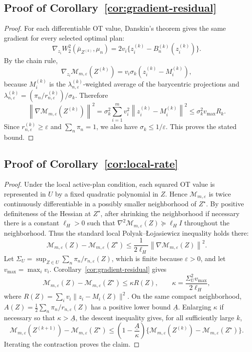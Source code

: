 \documentclass[pdflatex,sn-mathphys-ay]{sn-jnl}%
\theoremstyle{thmstyleone}%
\theoremstyle{thmstyletwo}%
\theoremstyle{thmstylethree}%
\newcommand{\calM}{\mathcal M}
\newcommand{\eps}{\varepsilon}
\newcommand{\barmu}{\bar\mu}
\newcommand{\norm}[1]{\left\lVert #1\right\rVert}
\begin{document}
\begin{appendices}
\subsection{Proof of Corollary~\ref{cor:gradient-residual}}
\begin{proof}
For each differentiable OT value, Danskin's theorem gives the same gradient for every selected optimal plan:
\[
\nabla_{z_i}W_2^2(\barmu_{Z^{(k)}},\mu_n)
=
2v_i\{z_i^{(k)}-B_n^{(k)}(z_i^{(k)})\}.
\]
By the chain rule,
\[
\nabla_{z_i}\calM_{m,\eps}(Z^{(k)})
=
 v_i \sigma_k\left(z_i^{(k)}-M_i^{(k)}\right),
\]
because \(M_i^{(k)}\) is the \(\lambda_{n,\eps}^{(k)}\)-weighted average of the barycentric projections and \(\lambda_{n,\eps}^{(k)}=(\pi_n/r_{n,\eps}^{(k)})/\sigma_k\). Therefore
\[
\norm{\nabla \calM_{m,\eps}(Z^{(k)})}^2
= \sigma_k^2\sum_{i=1}^m v_i^2\norm{z_i^{(k)}-M_i^{(k)}}^2
\le \sigma_k^2 v_{\max} R_k.
\]
Since \(r_{n,\eps}^{(k)}\ge \eps\) and \(\sum_n\pi_n=1\), we also have \(\sigma_k\le1/\eps\). This proves the stated bound.
\end{proof}

\subsection{Proof of Corollary~\ref{cor:local-rate}}
\begin{proof}
Under the local active-plan condition, each squared OT value is represented in \(U\) by a fixed quadratic polynomial in \(Z\). Hence \(\calM_{m,\eps}\) is twice continuously differentiable in a possibly smaller neighborhood of \(Z^\star\). By positive definiteness of the Hessian at \(Z^\star\), after shrinking the neighborhood if necessary there is a constant \(\ell_H>0\) such that \(\nabla^2\calM_{m,\eps}(Z)\succeq \ell_H I\) throughout the neighborhood. Thus the standard local Polyak--\L{}ojasiewicz inequality holds there:
\[
    \calM_{m,\eps}(Z)-\calM_{m,\eps}(Z^\star)
    \le \frac{1}{2\ell_H}\norm{\nabla\calM_{m,\eps}(Z)}^2.
\]
Let \(\Sigma_U=\sup_{Z\in U}\sum_n\pi_n/r_{n,\eps}(Z)\), which is finite because \(\eps>0\), and let \(v_{\max}=\max_i v_i\). Corollary~\ref{cor:gradient-residual} gives
\[
    \calM_{m,\eps}(Z)-\calM_{m,\eps}(Z^\star)
    \le \kappa R(Z),
    \qquad
    \kappa=\frac{\Sigma_U^2 v_{\max}}{2\ell_H},
\]
where \(R(Z)=\sum_i v_i\|z_i-M_i(Z)\|^2\). On the same compact neighborhood, \(A(Z)=\frac12\sum_n\pi_n/r_{n,\eps}(Z)\) has a positive lower bound \(\underline A\). Enlarging \(\kappa\) if necessary so that \(\kappa>\underline A\), the descent inequality gives, for all sufficiently large \(k\),
\[
\calM_{m,\eps}(Z^{(k+1)})-\calM_{m,\eps}(Z^\star)
\le
\left(1-\frac{\underline A}{\kappa}\right)
\{\calM_{m,\eps}(Z^{(k)})-\calM_{m,\eps}(Z^\star)\}.
\]
Iterating the contraction proves the claim.
\end{proof}


\end{appendices}
\end{document}
